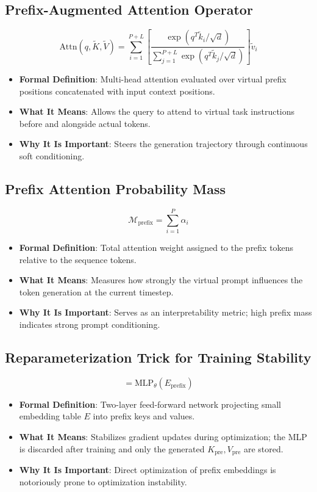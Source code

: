 \documentclass[11pt,a4paper]{article}
\theoremstyle{definition}
\begin{document}
\subsection{Prefix-Augmented Attention Operator}
{\boldmath
\begin{equation}
\text{Attn}(q, \tilde{K}, \tilde{V}) = \sum_{i=1}^{P+L} \left[ \frac{\exp(q^T \tilde{k}_i / \sqrt{d})}{\sum_{j=1}^{P+L} \exp(q^T \tilde{k}_j / \sqrt{d})} \right] \tilde{v}_i
\end{equation}
}
\begin{itemize}
    \item \textbf{Formal Definition}: Multi-head attention evaluated over virtual prefix positions concatenated with input context positions.
    \item \textbf{What It Means}: Allows the query to attend to virtual task instructions before and alongside actual tokens.
    \item \textbf{Why It Is Important}: Steers the generation trajectory through continuous soft conditioning.
\end{itemize}

\subsection{Prefix Attention Probability Mass}
{\boldmath
\begin{equation}
\mathcal{M}_{\text{prefix}} = \sum_{i=1}^P \alpha_i
\end{equation}
}
\begin{itemize}
    \item \textbf{Formal Definition}: Total attention weight assigned to the prefix tokens relative to the sequence tokens.
    \item \textbf{What It Means}: Measures how strongly the virtual prompt influences the token generation at the current timestep.
    \item \textbf{Why It Is Important}: Serves as an interpretability metric; high prefix mass indicates strong prompt conditioning.
\end{itemize}

\subsection{Reparameterization Trick for Training Stability}
{\boldmath
\begin{equation}
[K_{\text{pre}}, V_{\text{pre}}] = \text{MLP}_{\theta}(E_{\text{prefix}})
\end{equation}
}
\begin{itemize}
    \item \textbf{Formal Definition}: Two-layer feed-forward network projecting small embedding table $E$ into prefix keys and values.
    \item \textbf{What It Means}: Stabilizes gradient updates during optimization; the MLP is discarded after training and only the generated $K_{\text{pre}}, V_{\text{pre}}$ are stored.
    \item \textbf{Why It Is Important}: Direct optimization of prefix embeddings is notoriously prone to optimization instability.
\end{itemize}
\end{document}
